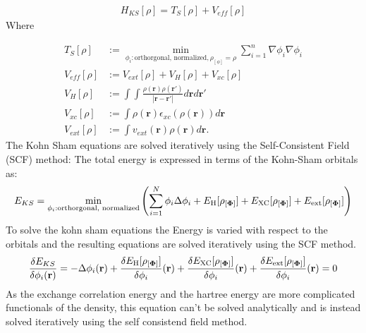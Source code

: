\begin{align}
    H_{KS}[\rho] = T_S[\rho] + V_{eff}[\rho]
\end{align}
Where

\begin{align}
    T_S[\rho] &:=\min _{\phi_i: \text {orthorgonal, normalized}, \rho_{[\phi]}=\rho }\sum\limits_{i=1}^n\nabla\phi_i \nabla \phi_i\\
    V_{eff}[\rho] &:= V_{ext}[\rho] + V_H[\rho] + V_{xc}[\rho]\\
    V_H[\rho] &:= \int\int \frac{\rho(\mathbf{r})\rho(\mathbf{r'})}{|\mathbf{r}-\mathbf{r'}|}d\mathbf{r}d\mathbf{r'}\\
    V_{xc}[\rho] &:= \int \rho(\mathbf{r})\epsilon_{xc}(\rho(\mathbf{r}))d\mathbf{r}\\
    V_{ext}[\rho] &:= \int v_{ext}(\mathbf{r})\rho(\mathbf{r})d\mathbf{r}.
\end{align}
The Kohn Sham equations are solved iteratively using the Self-Consistent Field (SCF) method:
The total energy is expressed in terms of the Kohn-Sham orbitals as:
\begin{align}
    E_{KS} = \min _{\phi_i: \text {orthorgonal, normalized}} \left( \sum_{i=1}^N \phi_i \Delta \phi_i + E_\text{H}[\rho_{[\mathbf{\Phi}]}]+ E_\text{XC}[\rho_{[\mathbf{\Phi}]}]+E_\text{ext}[\rho_{[\mathbf{\Phi}]}]\right)
\end{align}
To solve the kohn sham equations the Energy is varied with respect to the orbitals and the resulting equations are solved iteratively using the SCF method.
\begin{align}
    \frac{\delta E_{KS}}{\delta \phi_i(\mathbf{r})} = -\Delta \phi_i(\mathbf{r}) + \frac{\delta E_\text{H}[\rho_{[\mathbf{\Phi}]}]}{\delta \phi_i}(\mathbf{r}) + \frac{\delta E_\text{XC}[\rho_{[\mathbf{\Phi}]}]}{\delta \phi_i}(\mathbf{r}) + \frac{\delta E_\text{ext}[\rho_{[\mathbf{\Phi}]}]}{\delta \phi_i}(\mathbf{r}) = 0
\end{align}
As the exchange correlation energy and the hartree energy are more complicated functionals of the density, this equation can't be solved analytically and is instead solved iteratively using the self consistend field method.
